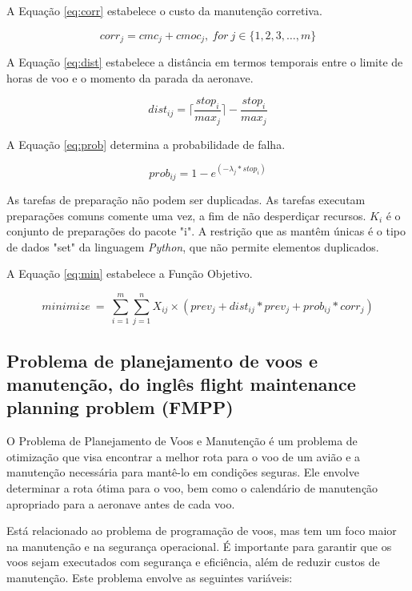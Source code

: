 \documentclass{article}
\begin{document}
A Equação \ref{eq:corr} estabelece o custo da manutenção corretiva.

\begin{equation}\label{eq:corr}
corr_j =  cmc_j + cmoc_j,\ for\ j \in \{1, 2, 3, \ldots, m\}
\end{equation}


A Equação  \ref{eq:dist} estabelece a distância em termos temporais entre o limite de horas de voo e o momento da parada da aeronave.

\begin{equation}\label{eq:dist}
dist_{ij} = \lceil{\frac{stop_i}{max_j}}\rceil{}-\frac{stop_i}{max_j} 
\end{equation}


A Equação  \ref{eq:prob} determina a probabilidade de falha.

\begin{equation}\label{eq:prob}
prob_{ij} = 1 - e^{(-\lambda{}_j * stop_i)}
\end{equation}

As tarefas de preparação não podem ser duplicadas. As tarefas executam preparações comuns comente uma vez, a fim de não desperdiçar recursos.
$K_i$ é o conjunto de preparações do pacote "i". A restrição que as mantêm únicas é o tipo de dados "set" da linguagem {\it Python}, que não permite elementos duplicados.


A Equação  \ref{eq:min} estabelece a Função Objetivo.

\begin{equation} \label{eq:min}
minimize\ =\ \sum_{i=1}^{m} \sum_{j=1}^{n} X_{ij} \times ( prev_j + dist_{ij}*prev_j + prob_{ij}*corr_j )
\end{equation}


\subsection{Problema de planejamento de voos e manutenção, do inglês flight maintenance planning problem (FMPP)}

O Problema de Planejamento de Voos e Manutenção é um problema de otimização que visa encontrar a melhor rota para o voo de um avião e a manutenção necessária para mantê-lo em condições seguras. Ele envolve determinar a rota ótima para o voo, bem como o calendário de manutenção apropriado para a aeronave antes de cada voo.

Está relacionado ao problema de programação de voos, mas tem um foco maior na manutenção e na segurança operacional. É importante para garantir que os voos sejam executados com segurança e eficiência, além de reduzir custos de manutenção. Este problema envolve as seguintes variáveis:
\end{document}

